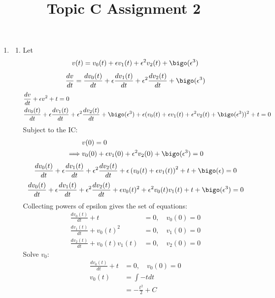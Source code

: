 \documentclass{/home/janmebows/Documents/LatexTemplates/myassignment}
\title{Topic C Assignment 2}
\begin{document}
\maketitle

\begin{enumerate}
    \item 
    \begin{enumerate}
        \item %
        Let 
        \[v(t) = v_0(t) + \epsilon v_1(t) + \epsilon^2 v_2(t) + \bigo(\epsilon^3) \]
        \[\frac{dv}{dt} = \frac{dv_0(t)}{dt} + \epsilon \frac{dv_1(t)}{dt} + \epsilon^2\frac{dv_2(t)}{dt} + \bigo(\epsilon^3)\]
        \begin{align*}
            &\frac{dv}{dt} + \epsilon v^2 + t = 0\\
            &\frac{dv_0(t)}{dt} + \epsilon \frac{dv_1(t)}{dt} + \epsilon^2\frac{dv_2(t)}{dt} +\bigo(\epsilon^3) + \epsilon(v_0(t) + \epsilon v_1(t) + \epsilon^2 v_2(t) + \bigo(\epsilon^3))^2 + t = 0
        \end{align*}
        Subject to the IC:
        \begin{align*}
            &v(0) = 0\\
            \implies &v_0(0) + \epsilon v_1(0) + \epsilon^2 v_2(0) + \bigo(\epsilon^3) = 0
        \end{align*}
        \[\frac{dv_0(t)}{dt} + \epsilon \frac{dv_1(t)}{dt} + \epsilon^2\frac{dv_2(t)}{dt} + \epsilon \left(v_0(t) + \epsilon v_1(t) \right)^2 +t + \bigo(\epsilon) = 0\]
        \[\frac{dv_0(t)}{dt} + \epsilon \frac{dv_1(t)}{dt} + \epsilon^2\frac{dv_2(t)}{dt} + \epsilon v_0(t)^2 + \epsilon^2 v_0(t)v_1(t) +t + \bigo(\epsilon^3) = 0\]
        Collecting powers of epsilon gives the set of equations:
        \begin{align*}
            \frac{dv_0(t)}{dt} + t &= 0, \quad v_0(0) = 0\\
            \frac{dv_1(t)}{dt} + v_0(t)^2 &= 0, \quad v_1(0) = 0 \\
            \frac{dv_2(t)}{dt} + v_0(t)v_1(t) &= 0, \quad v_2(0) = 0
        \end{align*}
        Solve $v_0$:
        \begin{align*}
            \frac{dv_0(t)}{dt} + t &= 0, \quad v_0(0) = 0\\
            v_0(t) &= \int -t dt\\
            &= -\frac{t^2}{2} + C\\

\end{align*}
\end{enumerate}
\end{enumerate}
\end{document}

